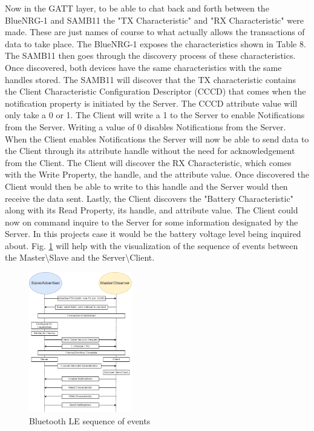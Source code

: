 \documentclass[journal,compsoc]{IEEEtran}
\begin{document}
Now in the GATT layer, to be able to chat back and forth between the BlueNRG-1 and SAMB11 the "TX Characteristic" and "RX Characteristic" were made. These are just names of course to what actually allows the transactions of data to take place. The BlueNRG-1 exposes the characteristics shown in Table 8. The SAMB11 then goes through the discovery process of these characteristics. Once discovered, both devices have the same characteristics with the same handles stored. The SAMB11 will discover that the TX characteristic contains the Client Characteristic Configuration Descriptor (CCCD) that comes when the notification property is initiated by the Server. The CCCD attribute value will only take a 0 or 1. The Client will write a 1 to the Server to enable Notifications from the Server. Writing a value of 0 disables Notifications from the Server. When the Client enables Notifications the Server will now be able to send data to the Client through its attribute handle without the need for acknowledgement from the Client. The Client will discover the RX Characteristic, which comes with the Write Property, the handle, and the attribute value. Once discovered the Client would then be able to write to this handle and the Server would then receive the data sent. Lastly, the Client discovers the "Battery Characteristic" along with its Read Property, its handle, and attribute value. The Client could now on command inquire to the Server for some information designated by the Server. In this projects case it would be the battery voltage level being inquired about. Fig. \ref{ble} will help with the visualization of the sequence of events between the Master\textbackslash Slave and the Server\textbackslash Client.
\begin{figure}[ht] 	%
\centering
\includegraphics[width=0.4\textwidth]{Bluetooth.png}
\caption{ \space Bluetooth LE sequence of events}
\label{ble}
\end{figure}
\end{document}
